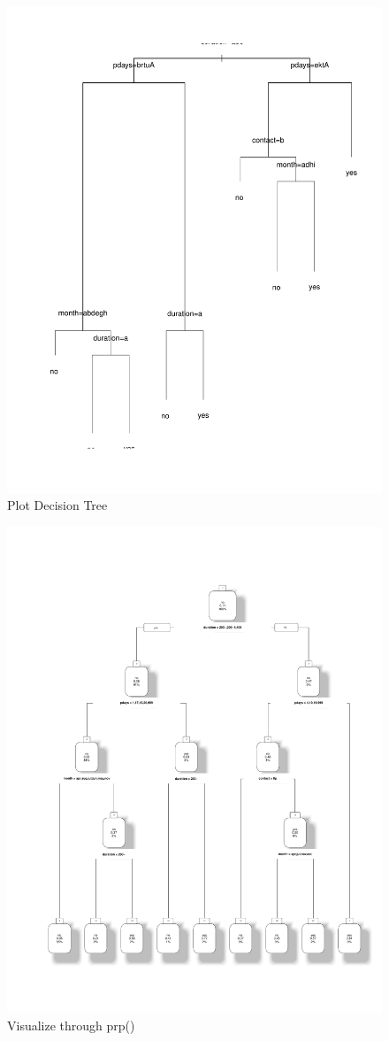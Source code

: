 \documentclass[12pt, a4paper, bibliography=totoc, english]{scrartcl}
\begin{document}

\begin{figure}
	\centering
	\includegraphics[width=0.7\linewidth]{plot_dt}
	\caption{Plot Decision Tree}
	\label{fig:plotdt}
\end{figure}

\begin{figure}
	\centering
	\includegraphics[width=0.7\linewidth]{prp_dt}
	\caption{Visualize through prp()}
	\label{fig:prpdt}
\end{figure}
\end{document}
